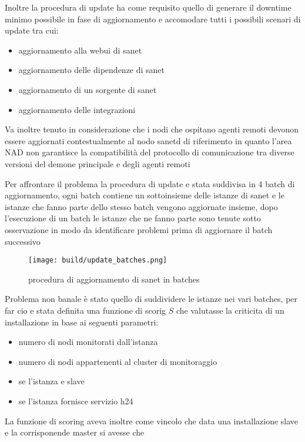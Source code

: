 Inoltre la procedura di update ha come requisito quello di generare il downtime minimo possibile in fase di aggiornamento e accomodare tutti i possibili scenari di update tra cui:

\begin{itemize}
  \item{aggiornamento alla webui di sanet}
  \item{aggiornamento delle dipendenze di sanet}
  \item{aggiornamento di un sorgente di sanet}
  \item{aggiornamento delle integrazioni}
\end{itemize}

Va inoltre tenuto in considerazione che i nodi che ospitano agenti remoti devonon essere aggiornati contestualmente al nodo sanetd di riferimento in quanto l'area NAD non garantisce la compatibilità del protocollo di comunicazione tra diverse versioni del demone principale e degli agenti remoti

Per affrontare il problema la procedura di update e stata suddivisa in 4 batch di aggiornamento, ogni batch contiene un sottoinsieme delle istanze di sanet e le istanze che fanno parte dello stesso batch vengono aggiornate insieme, dopo l'esecuzione di un batch le istanze che ne fanno parte sono tenute sotto osservazione in modo da identificare problemi prima di aggiornare il batch successivo

\begin{figure}[H]
    \centering
    \texttt{[image: build/update\_batches.png]}
    \caption{procedura di aggiornamento di sanet in batches}
    \label{fig:enter-label}
\end{figure}

Problema non banale è stato quello di suddividere le istanze nei vari batches, per far cio e stata definita una funzione di scorig \(S\) che valutasse la criticita di un installazione in base ai seguenti parametri:

\begin{itemize}
  \item{numero di nodi monitorati dall'istanza}
  \item{numero di nodi appartenenti al cluster di monitoraggio}
  \item{se l'istanza e slave}
  \item{se l'istanza fornisce servizio h24}
\end{itemize}

\newpage
La funzione di scoring aveva inoltre come vincolo che data una installazione slave e la corrisponende master si avesse che

